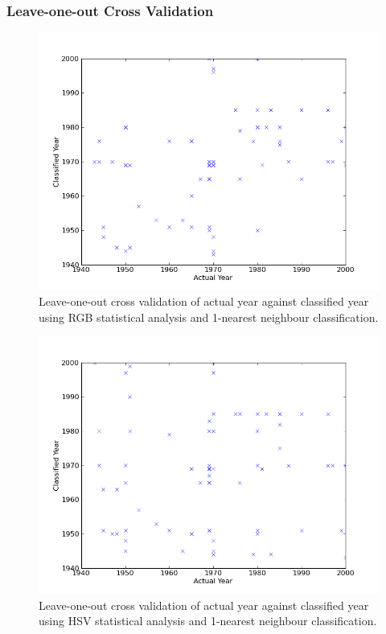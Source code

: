 \documentclass[11pt,fleqn,twoside]{article}
\begin{document}
\subsubsection{Leave-one-out Cross Validation}
\begin{figure}[h]
\centering
\includegraphics[scale=0.5]{img/validation-rgb-1nn.png}
\caption{Leave-one-out cross validation of actual year against classified year using RGB statistical analysis and
1-nearest neighbour classification.}
\label{fig:validation-rgb-1nn}
\end{figure}

\begin{figure}[h]
\centering
\includegraphics[scale=0.5]{img/validation-hsv-1nn.png}
\caption{Leave-one-out cross validation of actual year against classified year using HSV statistical analysis and
1-nearest neighbour classification.}
\label{fig:validation-rgb-1nn}
\end{figure}
\end{document}
